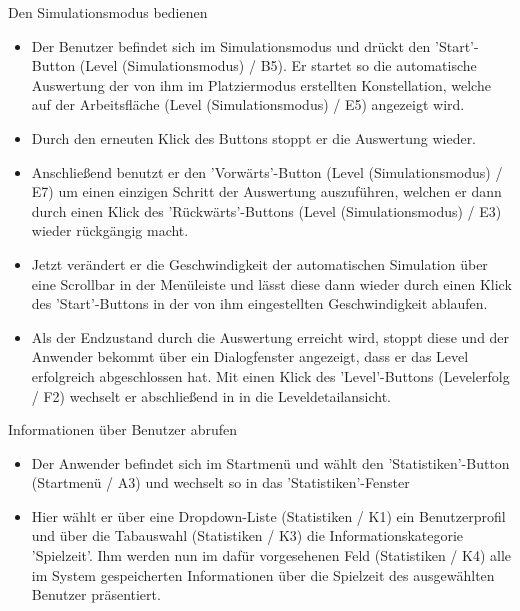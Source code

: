 \begin{requirements}
  	
  	
  	 Den Simulationsmodus bedienen
  	
	
	\begin{itemize}
	
  			\item Der Benutzer befindet sich im Simulationsmodus und drückt den 'Start'-Button (Level (Simulationsmodus) / B5). Er startet so die automatische Auswertung der von ihm im Platziermodus erstellten Konstellation, welche auf der Arbeitsfläche (Level (Simulationsmodus) / E5) angezeigt wird.
  			
  			\item Durch den erneuten Klick des Buttons stoppt er die Auswertung wieder.
  			
  			\item Anschließend benutzt er den 'Vorwärts'-Button (Level (Simulationsmodus) / E7) um einen einzigen Schritt der Auswertung auszuführen, welchen er dann durch einen Klick des 'Rückwärts'-Buttons (Level (Simulationsmodus) / E3) wieder rückgängig macht.
  			
  			\item Jetzt verändert er die Geschwindigkeit der automatischen Simulation über eine Scrollbar in der Menüleiste und lässt diese dann wieder durch einen Klick des 'Start'-Buttons in der von ihm eingestellten Geschwindigkeit ablaufen. 
  			
  			\item Als der Endzustand durch die Auswertung erreicht wird, stoppt diese und der Anwender bekommt über ein Dialogfenster angezeigt, dass er das Level erfolgreich abgeschlossen hat. Mit einen Klick des 'Level'-Buttons (Levelerfolg / F2) wechselt er abschließend in in die Leveldetailansicht.
  			
  			
  	\end{itemize}
  			

  	
  	 Informationen über Benutzer abrufen
  	
  	
  	\begin{itemize}
  	
		\item Der Anwender befindet sich im Startmenü und wählt den 'Statistiken'-Button (Startmenü / A3) und wechselt so in das 'Statistiken'-Fenster
		
		\item Hier wählt er über eine Dropdown-Liste (Statistiken / K1) ein Benutzerprofil und über die Tabauswahl (Statistiken / K3) die Informationskategorie 'Spielzeit'. Ihm werden nun im dafür vorgesehenen Feld (Statistiken / K4) alle im System gespeicherten Informationen über die Spielzeit des ausgewählten Benutzer präsentiert.
		

\end{itemize}
\end{requirements}
